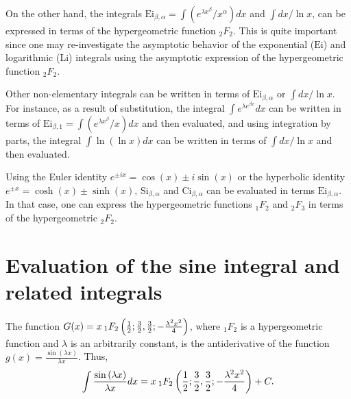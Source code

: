 \documentclass[smallextended]{svjour3}
\begin{document}
On the other hand, the integrals  $\text{Ei}_{\beta,\alpha}=\int (e^{\lambda x^\beta}/x^\alpha) dx$ and $\int dx/\ln{x}$, can be expressed in terms of the hypergeometric function $_{2}F_2$. This is quite important since one may re-investigate the asymptotic behavior of the exponential ($\text{Ei}$) and logarithmic ($\text{Li}$) integrals using the asymptotic expression of the hypergeometric function $_{2}F_2$.


Other non-elementary integrals can be written in terms of $\text{Ei}_{\beta,\alpha}$ or $\int dx/\ln{x}$.  For instance, as a result of substitution, the integral $\int e^{\lambda e^{\beta x}} dx$ can be written in terms of $\text{Ei}_{\beta,1}=\int (e^{\lambda x^\beta}/x) dx$ and then evaluated, and using integration by parts, the integral $\int \ln(\ln{x}) dx$ can be written in terms of $\int dx/\ln{x}$ and then evaluated.

Using the Euler identity $e^{\pm ix}=\cos(x)\pm i\sin(x)$ or the hyperbolic identity $e^{\pm x}=\cosh(x)\pm\sinh(x)$, $\text{Si}_{\beta,\alpha}$ and $\text{Ci}_{\beta,\alpha}$ can be evaluated in terms $\text{Ei}_{\beta,\alpha}$. In that case, one can express the hypergeometric functions $_{1}F_2$ and $_{2}F_3$ in terms of the hypergeometric $_{2}F_2$.


\section{Evaluation of the sine integral and related integrals} \label{sine-integral}

\begin{proposition}
The function $G(x)={x}\hspace{.075cm} _{1}F_{2}\left(\frac{1}{2};\frac{3}{2},\frac{3}{2};-\frac{\lambda^2 x^2}{4}\right)$, where ${}_1F_2$ is a hypergeometric function \cite{AS} and $\lambda$ is an arbitrarily constant, is the antiderivative of the function $g(x)=\frac{\sin{(\lambda x)
}}{\lambda x}$. Thus,
\begin{equation}
\int\frac{\sin{(\lambda x)}}{\lambda x}dx={x}\hspace{.075cm} _{1}F_{2}\left(\frac{1}{2};\frac{3}{2},\frac{3}{2};-\frac{\lambda^2 x^2}{4}\right)+C.
\label{prp1-1}
\end{equation}
\label{prp1}
\end{proposition}
\end{document}

